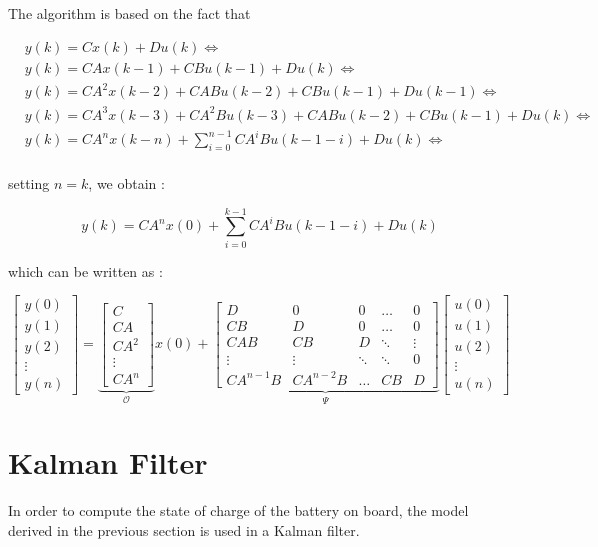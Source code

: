 \documentclass{article}
\begin{document}
The algorithm is based on the fact that 

\begin{align}
& y(k) = Cx(k) + Du(k) \Leftrightarrow \\
& y(k) = CAx(k-1) + CBu(k-1) + Du(k) \Leftrightarrow \\
& y(k) =  CA^2x(k-2) + CABu(k-2) + CBu(k-1) + Du(k-1) \Leftrightarrow \\ 
& y(k) = CA^3x(k-3) + CA^2Bu(k-3) + CABu(k-2) + CBu(k-1) + Du(k) \Leftrightarrow \\
& y(k) = CA^nx(k-n) + \sum_{i=0}^{n-1} CA^iBu(k-1-i) + Du(k) \Leftrightarrow \\
\end{align}

\noindent setting $n=k$, we obtain : 

\begin{equation}
y(k) = CA^nx(0) + \sum_{i=0}^{k-1} CA^iBu(k-1-i) + Du(k)
\end{equation}

\noindent which can be written as : 

\[
\left[ \begin{array}{c}
y(0) \\
y(1) \\
y(2) \\
\vdots \\
y(n)
\end{array} \right]
%
= \underbrace{\left[ \begin{array}{c}
C \\
CA \\
CA^2 \\
\vdots \\
CA^n
\end{array} \right]}_{\mathcal{O}}
%
x(0)
%
+ \underbrace{\left[ \begin{array}{ccccc}
D & 0 & 0 & \dots & 0\\
CB & D & 0 & \dots & 0\\
CAB & CB & D & \ddots & \vdots \\
\vdots & \vdots & \ddots & \ddots  & 0\\
CA^{n-1}B & CA^{n-2}B & \dots & CB & D
\end{array} \right]}_{\Psi}
%
\left[ \begin{array}{cc}
u(0) \\
u(1) \\
u(2) \\
\vdots \\
u(n)
\end{array} \right]
\]

\section{Kalman Filter}
In order to compute the state of charge of the battery on board, the model derived in the previous section is used in a Kalman filter. 
\end{document}
